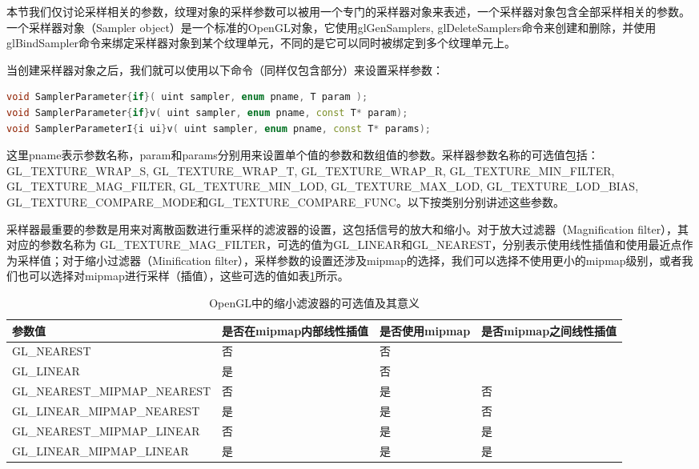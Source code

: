 本节我们仅讨论采样相关的参数，纹理对象的采样参数可以被用一个专门的采样器对象来表述，一个采样器对象包含全部采样相关的参数。一个采样器对象（Sampler object）是一个标准的OpenGL对象，它使用glGenSamplers, glDeleteSamplers命令来创建和删除，并使用glBindSampler命令来绑定采样器对象到某个纹理单元，不同的是它可以同时被绑定到多个纹理单元上。

当创建采样器对象之后，我们就可以使用以下命令（同样仅包含部分）来设置采样参数：

\begin{lstlisting}[language=C++]
void SamplerParameter{if}( uint sampler, enum pname, T param );
void SamplerParameter{if}v( uint sampler, enum pname, const T* param);
void SamplerParameterI{i ui}v( uint sampler, enum pname, const T* params);
\end{lstlisting}

这里pname表示参数名称，param和params分别用来设置单个值的参数和数组值的参数。采样器参数名称的可选值包括：GL\_TEXTURE\_WRAP\_S, GL\_TEXTURE\_WRAP\_T, GL\_TEXTURE\_WRAP\_R, GL\_TEXTURE\_MIN\_FILTER, GL\_TEXTURE\_MAG\_FILTER, GL\_TEXTURE\_MIN\_LOD, GL\_TEXTURE\_MAX\_LOD, GL\_TEXTURE\_LOD\_BIAS, GL\_TEXTURE\_COMPARE\_MODE和GL\_TEXTURE\_COMPARE\_FUNC。以下按类别分别讲述这些参数。

采样器最重要的参数是用来对离散函数进行重采样的滤波器的设置，这包括信号的放大和缩小。对于放大过滤器（Magnification filter），其对应的参数名称为 GL\_TEXTURE\_MAG\_FILTER，可选的值为GL\_LINEAR和GL\_NEAREST，分别表示使用线性插值和使用最近点作为采样值；对于缩小过滤器（Minification filter），采样参数的设置还涉及mipmap的选择，我们可以选择不使用更小的mipmap级别，或者我们也可以选择对mipmap进行采样（插值），这些可选的值如表\ref{t:api-minification-filter}所示。

\begin{table}
\caption{OpenGL中的缩小滤波器的可选值及其意义}
\label{t:api-minification-filter}
\centering
\begin{tabular}{>{\small}p{}|>{\small}p{}|>{\small}p{}|>{\small}p{}}
\hline 
   参数值 & 是否在mipmap内部线性插值 & 是否使用mipmap & 是否mipmap之间线性插值\\
    \hline  
    GL\_NEAREST                  &  否   &  否   &\\
    GL\_LINEAR                   &  是   &  否   &\\
    GL\_NEAREST\_MIPMAP\_NEAREST &  否   &  是   &否\\
    GL\_LINEAR\_MIPMAP\_NEAREST  &  是   &  是   &否\\
    GL\_NEAREST\_MIPMAP\_LINEAR  &  否   &  是   &是\\
    GL\_LINEAR\_MIPMAP\_LINEAR   &  是   &  是   &是\\

 \hline 
\end{tabular}
\end{table}

